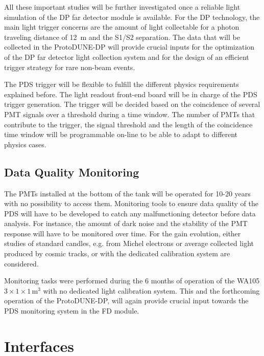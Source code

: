 All these important studies will be further investigated once a reliable light simulation of the DP far detector module is available. For the DP technology, the main light trigger concerns are the amount of light collectable for a photon traveling distance of \SI{12}{m} and the S1/S2 separation. The data that will be collected in the ProtoDUNE-DP will provide crucial inputs for the optimization of the DP far detector light collection system and for the design of an efficient trigger strategy for rare non-beam events. 

The PDS trigger will be flexible to fulfill the different physics requirements explained before. The light readout front-end board will be in charge of the PDS trigger generation. The trigger will be decided based on the coincidence of several PMT signals over a threshold during a time window. The number of PMTs that contribute to the trigger, the signal threshold and the length of the coincidence time window will be programmable on-line to be able to adapt to different physics cases.


\subsection{Data Quality Monitoring}
\label{sec:fddp-pd-7.3}

The PMTs installed at the bottom of the tank will be operated for 10-20 years with no possibility to access them. Monitoring tools to ensure data quality of the PDS will have to be developed to catch any malfunctioning detector before data analysis. For instance, the amount of dark noise and the stability of the PMT response will have to be monitored over time. For the gain evolution, either studies of standard candles, e.g. from Michel electrons or average collected light produced by cosmic tracks, or with the dedicated calibration system are considered.

Monitoring tasks were performed during the 6 months of operation of the WA105 $3\times1\times1$\,m$^3$ with no dedicated light calibration system. This and the forthcoming operation of the ProtoDUNE-DP, will again provide crucial input towards the PDS monitoring system in the FD module.

\section{Interfaces}
\label{sec:fddp-pd-8}


